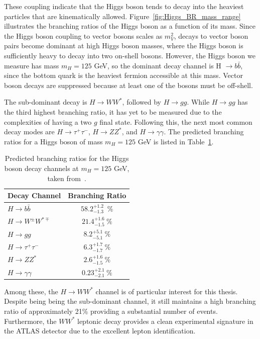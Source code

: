 These coupling indicate that the Higgs boson tends to decay into the heaviest particles that are kinematically allowed. Figure~\ref{fig:Higgs_BR_mass_range} illustrates the branching ratios of the Higgs boson as a function of its mass. Since the Higgs boson coupling to vector bosons scales as $m_{V}^{2}$, decays to vector boson pairs become dominant at high Higgs boson masses, where the Higgs boson is sufficiently heavy to decay into two on-shell bosons. However, the Higgs boson we measure has mass $m_{H} = 125$ GeV, so the dominant decay channel is H $\rightarrow b\bar{b}$, since the bottom quark is the heaviest fermion accessible at this mass. Vector boson decays are suppressed because at least one of the bosons must be off-shell. 

The sub-dominant decay is $H \rightarrow WW^{*}$, followed by $H \rightarrow gg$. While $H \rightarrow gg$ has the third highest branching ratio, it has yet to be measured due to the complexities of having a two $g$ final state. Following this, the next most common decay modes are $H \rightarrow \tau^{+}\tau^{-}$, $H \rightarrow ZZ^{*}$, and $H \rightarrow \gamma\gamma$. The predicted branching ratios for a Higgs boson of mass $m_{H} = 125$ GeV is listed in Table~\ref{tab:BRs}.

\begin{table}[h]
  \centering
  \begin{tabular}{l|c}
    \hline
    Decay Channel & Branching Ratio \\
    \hline
    $H \rightarrow b\bar{b}$ & $58.2^{+1.2}_{-1.3}$~\% \\
    $H \rightarrow W^{\pm}W^{*\mp}$ & $21.4^{+1.6}_{-1.5}~\%$ \\
    $H \rightarrow gg$ & $8.2^{+5.1}_{-5.1}~\%$ \\
    $H \rightarrow \tau^{+}\tau^{-}$ & $6.3^{+1.7}_{-1.7}~\%$ \\
    $H \rightarrow ZZ^{*}$ & $2.6^{+1.6}_{-1.5}~\%$ \\
    $H \rightarrow \gamma\gamma$ & $0.23^{+2.1}_{-2.1}~\%$ \\
    \hline
  \end{tabular}
  \caption{Predicted branching ratios for the Higgs boson decay channels at $m_{H} = 125$ GeV, taken from~\cite{LHC_Higgs_handbook}.}\label{tab:BRs}
\end{table}

Among these, the $H \rightarrow WW^{*}$ channel is of particular interest for this thesis. Despite being being the sub-dominant channel, it still maintains a high branching ratio of approximately 21\% providing a substantial number of events. Furthermore, the $WW^{*}$ leptonic decay provides a clean experimental signature in the ATLAS detector due to the excellent lepton identification.

